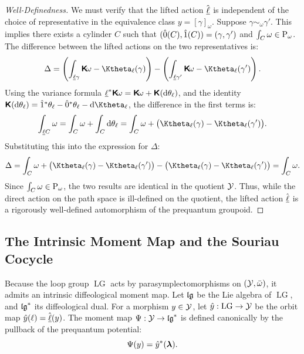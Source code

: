 \documentclass[11pt,reqno,letterpaper,twoside]{amsart}
\renewcommand{\Komega}{\CHO\!\omega}
\def\u(#1){\uline{#1}}
\newcommand{\LG}{\operatorname{LG}}
\begin{document}
  \begin{proof}[Well-Definedness]
    We must verify that the lifted action $\hat{\u(\ell)}$ is independent of the choice of representative in the equivalence class $y = [\gamma]_\omega$.
    Suppose $\gamma \sim_\omega \gamma'$.
    This implies there exists a cylinder $C$ such that $\Ends(C) = (\gamma, \gamma')$ and $\int_C \omega \in \operatorname{P}_\omega$.
    The difference between the lifted actions on the two representatives is:
    \[
      \Delta = \left( \int_{\u(\ell)\gamma} \Komega - \Ktheta_\ell(\gamma) \right) - \left( \int_{\u(\ell)\gamma'} \Komega - \Ktheta_\ell(\gamma') \right).
      \]
    Using the variance formula $\u(\ell)^*\Komega = \Komega + \CHO(\der\theta_\ell)$,
    and the identity $\CHO(\der\theta_\ell) = \1^*\theta_\ell - \0^*\theta_\ell - \der \Ktheta_\ell$,
    the difference in the first terms is:
    \[
      \int_{\u(\ell)C} \omega = \int_C \omega + \int_C \der\theta_\ell = \int_C \omega + \bigl( \Ktheta_\ell(\gamma) - \Ktheta_\ell(\gamma') \bigr).
      \]
    Substituting this into the expression for $\Delta$:
    \[
      \Delta = \int_C \omega + \bigl( \Ktheta_\ell(\gamma) - \Ktheta_\ell(\gamma') \bigr) - \bigl( \Ktheta_\ell(\gamma) - \Ktheta_\ell(\gamma') \bigr) = \int_C \omega.
      \]
    Since $\int_C \omega \in \operatorname{P}_\omega$,
    the two results are identical in the quotient $\mathcal{Y}$.
    Thus,
    while the direct action on the path space is ill-defined on the quotient,
    the lifted action $\hat{\u(\ell)}$ is a rigorously well-defined automorphism of the prequantum groupoid.
  \end{proof}
  
  \subsection{The Intrinsic Moment Map and the Souriau Cocycle}
  
  Because the loop group $\LG$ acts by parasymplectomorphisms on $(\mathcal{Y}, \bar{\omega})$,
  it admits an intrinsic diffeological moment map.
  Let $\LieAlgebra{lg}$ be the Lie algebra of $\LG$,
  and $\LieAlgebra{lg}^*$ its diffeological dual.
  For a morphism $y \in \mathcal{Y}$,
  let $\hat{y}: \LG \to \cY$ be the orbit map $\hat{y}(\ell) = \hat{\u(\ell)}(y)$.
  The moment map $\Psi: \cY \to \LieAlgebra{lg}^*$ is defined canonically by the pullback of the prequantum potential:
  \[
    \Psi(y) = \hat{y}^*(\boldsymbol \lambda).
    \]
  
\end{document}
